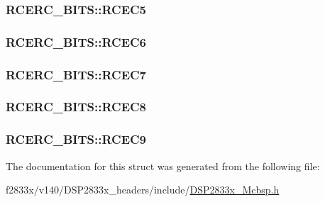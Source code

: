 \subsubsection[{R\+C\+E\+C5}]{ R\+C\+E\+R\+C\+\_\+\+B\+I\+T\+S\+::\+R\+C\+E\+C5}\label{struct_r_c_e_r_c___b_i_t_s_a8396e44893bf44deb85740451c8a4f1a}
\hypertarget{struct_r_c_e_r_c___b_i_t_s_a795315927bdcd68980deb8558ea1a323}{}
\subsubsection[{R\+C\+E\+C6}]{ R\+C\+E\+R\+C\+\_\+\+B\+I\+T\+S\+::\+R\+C\+E\+C6}\label{struct_r_c_e_r_c___b_i_t_s_a795315927bdcd68980deb8558ea1a323}
\hypertarget{struct_r_c_e_r_c___b_i_t_s_a636045190e851ed6173e8397e135c193}{}
\subsubsection[{R\+C\+E\+C7}]{ R\+C\+E\+R\+C\+\_\+\+B\+I\+T\+S\+::\+R\+C\+E\+C7}\label{struct_r_c_e_r_c___b_i_t_s_a636045190e851ed6173e8397e135c193}
\hypertarget{struct_r_c_e_r_c___b_i_t_s_aa83398c1987b19cbad995401d0c119a8}{}
\subsubsection[{R\+C\+E\+C8}]{ R\+C\+E\+R\+C\+\_\+\+B\+I\+T\+S\+::\+R\+C\+E\+C8}\label{struct_r_c_e_r_c___b_i_t_s_aa83398c1987b19cbad995401d0c119a8}
\hypertarget{struct_r_c_e_r_c___b_i_t_s_affdcc7925c04083936902a5d1ffdb0aa}{}
\subsubsection[{R\+C\+E\+C9}]{ R\+C\+E\+R\+C\+\_\+\+B\+I\+T\+S\+::\+R\+C\+E\+C9}\label{struct_r_c_e_r_c___b_i_t_s_affdcc7925c04083936902a5d1ffdb0aa}


The documentation for this struct was generated from the following file\+:\begin{DoxyCompactItemize}
\item 
f2833x/v140/\+D\+S\+P2833x\+\_\+headers/include/\hyperlink{_d_s_p2833x___mcbsp_8h}{D\+S\+P2833x\+\_\+\+Mcbsp.\+h}\end{DoxyCompactItemize}
